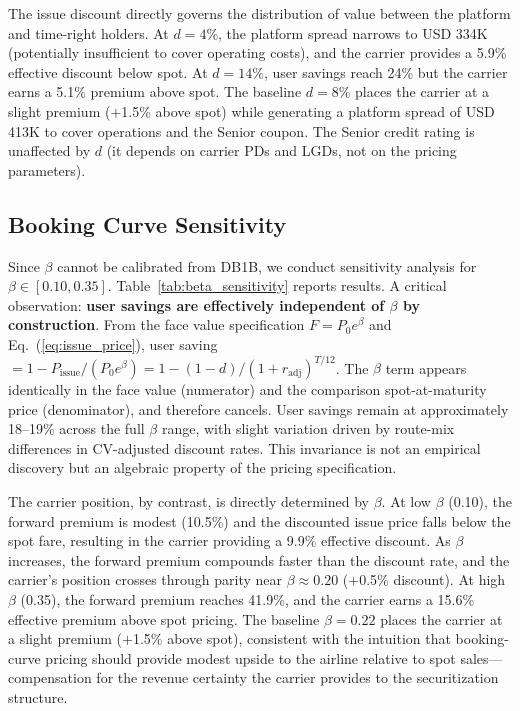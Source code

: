 \documentclass[12pt,a4paper]{article}
\begin{document}
The issue discount directly governs the distribution of value between the platform and time-right holders. At $d = 4\%$, the platform spread narrows to USD 334K (potentially insufficient to cover operating costs), and the carrier provides a 5.9\% effective discount below spot. At $d = 14\%$, user savings reach 24\% but the carrier earns a 5.1\% premium above spot. The baseline $d = 8\%$ places the carrier at a slight premium ($+$1.5\% above spot) while generating a platform spread of USD 413K to cover operations and the Senior coupon. The Senior credit rating is unaffected by $d$ (it depends on carrier PDs and LGDs, not on the pricing parameters).

\subsection{Booking Curve Sensitivity}

Since $\beta$ cannot be calibrated from DB1B, we conduct sensitivity analysis for $\beta \in [0.10, 0.35]$. Table~\ref{tab:beta_sensitivity} reports results. A critical observation: \textbf{user savings are effectively independent of $\beta$ by construction}. From the face value specification $F = P_0 e^{\beta}$ and Eq.~(\ref{eq:issue_price}), user saving $= 1 - P_{\text{issue}} / (P_0 e^{\beta}) = 1 - (1-d) / (1+r_{\text{adj}})^{T/12}$. The $\beta$ term appears identically in the face value (numerator) and the comparison spot-at-maturity price (denominator), and therefore cancels. User savings remain at approximately 18--19\% across the full $\beta$ range, with slight variation driven by route-mix differences in CV-adjusted discount rates. This invariance is not an empirical discovery but an algebraic property of the pricing specification.

The carrier position, by contrast, is directly determined by $\beta$. At low $\beta$ (0.10), the forward premium is modest (10.5\%) and the discounted issue price falls below the spot fare, resulting in the carrier providing a 9.9\% effective discount. As $\beta$ increases, the forward premium compounds faster than the discount rate, and the carrier's position crosses through parity near $\beta \approx 0.20$ ($+$0.5\% discount). At high $\beta$ (0.35), the forward premium reaches 41.9\%, and the carrier earns a 15.6\% effective premium above spot pricing. The baseline $\beta = 0.22$ places the carrier at a slight premium ($+$1.5\% above spot), consistent with the intuition that booking-curve pricing should provide modest upside to the airline relative to spot sales---compensation for the revenue certainty the carrier provides to the securitization structure.
\end{document}
